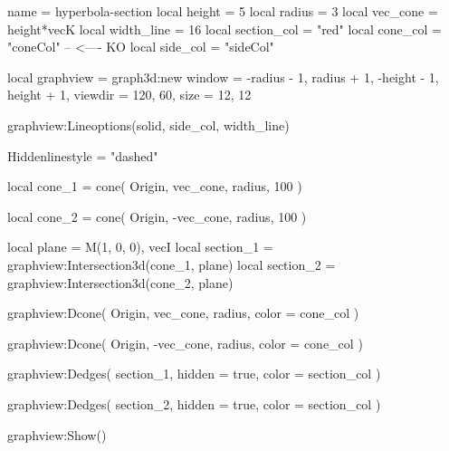 \documentclass{standalone}
\begin{document}

\begin{luadraw}{name = hyperbola-section}
local height      =  5
local radius      =  3
local vec_cone    = height*vecK
local width_line  =  16
local section_col = "red"
local cone_col    = "coneCol"   --   <---- KO
local side_col    = "sideCol"

local graphview = graph3d:new{
  window  = {-radius - 1, radius + 1, -height - 1, height + 1},
  viewdir = {120, 60},
  size    = {12, 12}
}

graphview:Lineoptions(solid, side_col, width_line)

Hiddenlinestyle = "dashed"

local cone_1 = cone(
  Origin, vec_cone, radius,
  100
)

local cone_2 = cone(
  Origin,  -vec_cone, radius,
  100
)

local plane     = {M(1, 0, 0), vecI}
local section_1 = graphview:Intersection3d(cone_1, plane)
local section_2 = graphview:Intersection3d(cone_2, plane)

graphview:Dcone(
  Origin, vec_cone, radius,
  {
    color = cone_col
  })

graphview:Dcone(
  Origin, -vec_cone, radius,
  {
    color = cone_col
  })

graphview:Dedges(
  section_1,
  {
    hidden = true,
    color = section_col
  })

graphview:Dedges(
  section_2,
  {
    hidden = true,
    color = section_col
  })

graphview:Show()
\end{luadraw}
\end{document}
